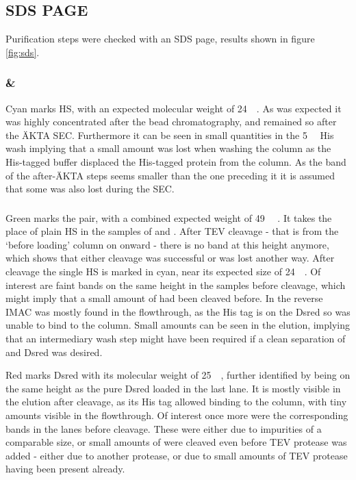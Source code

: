 \subsection{SDS PAGE}

Purification steps were checked with an SDS page, results shown in figure
\ref{fig:sds}.

\subsubsection{\hs{} \& \hsmut{}}

Cyan marks HS, with an expected molecular weight of
\SI{24}{\kilo\Da}\cite{pdb}. As was expected it was highly concentrated after
the  bead chromatography, and remained so after the ÄKTA SEC.
Furthermore it can be seen in small quantities in the \SI{5}{\milli\Molar} His
wash implying that a small amount was lost when washing the column as the
His-tagged buffer displaced the His-tagged protein from the column. As the band
of the after-ÄKTA steps seems smaller than the one preceding it it is assumed
that some was also lost during the SEC.

\subsubsection{\hsdsred{}}

Green marks the \hsdsred{} pair, with a combined expected weight of
\SI{49}{\kilo\Da} \cite{pdb}. It takes the place of plain HS in the samples of
\hs{} and \hsmut{}. After TEV cleavage - that is from the `before loading'
column on onward - there is no band at this height anymore, which shows that
either cleavage was successful or \hsdsred{} was lost another way. After
cleavage the single HS is marked in cyan, near its expected size of
\SI{24}{\kilo\Da}. Of interest are faint bands on the same height in the
samples before cleavage, which might imply that a small amount of \hsdsred{}
had been cleaved before. In the reverse IMAC \hs{} was mostly found in the
flowthrough, as the His tag is on the Dsred so \hs{} was unable to bind to the
column. Small amounts can be seen in the elution, implying that an intermediary
wash step might have been required if a clean separation of \hs{} and Dsred was
desired.

Red marks Dsred with its molecular weight of \SI{25}{\kilo\Da}, further
identified by being on the same height as the pure Dsred loaded in the last
lane. It is mostly visible in the elution after cleavage, as its His tag
allowed binding to the column, with tiny amounts visible in the flowthrough. Of
interest once more were the corresponding bands in the lanes before cleavage.
These were either due to impurities of a comparable size, or small amounts of
\hsdsred were cleaved even before TEV protease was added - either due to
another protease, or due to small amounts of TEV protease having been present
already.

